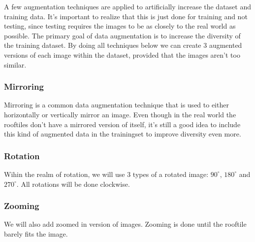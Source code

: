 A few augmentation techniques are applied to artificially increase the dataset and training data. 
It's important to realize that this is just done for training and not testing, 
since testing requires the images to be as closely to the real world as possible. 
The primary goal of data augmentation is to increase the diversity of the training dataset. 
By doing all techniques below we can create 3 augmented versions of each image within the dataset, provided that the images aren't too similar.

\subsubsection{Mirroring}
Mirroring is a common data augmentation technique that is used to either horizontally or vertically mirror an image. 
Even though in the real world the rooftiles don't have a mirrored version of itself, 
it's still a good idea to include this kind of augmented data in the trainingset to improve diversity even more.

\subsubsection{Rotation}
Wihin the realm of rotation, we will use 3 types of a rotated image: $90^{\circ}$, $180^{\circ}$ and $270^{\circ}$. 
All rotations will be done clockwise.

\subsubsection{Zooming}
We will also add zoomed in version of images. Zooming is done until the rooftile barely fits the image. 






